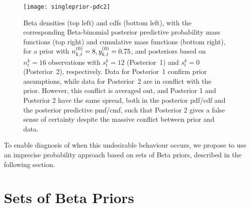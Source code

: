 \documentclass[12pt, a4paper]{elsarticle}
\begin{document}
\begin{figure}
\texttt{[image: singleprior-pdc2]}
\caption{Beta densities (top left) and cdfs (bottom left),
with the corresponding Beta-binomial posterior predictive probability mass functions (top right) and cumulative mass functions (bottom right),
for a prior with $n^{(0)}_{k,t} = 8, y^{(0)}_{k,t} = 0.75$,
and posteriors based on $n^k_t=16$ observations with $s^k_t=12$ (Posterior~1) and $s^k_t=0$ (Posterior~2), respectively.
Data for Posterior~1 confirm prior assumptions,
while data for Posterior~2 are in conflict with the prior.
However, this conflict is averaged out,
and Posterior 1 and Posterior 2 have the same spread, both in the posterior pdf/cdf and the posterior predictive pmf/cmf,
such that Posterior 2 gives a false sense of certainty despite the massive conflict between prior and data.}
\label{fig:singleprior-pdc}
\end{figure}

To enable diagnosis of when this undesirable behaviour occurs,
we propose to use an imprecise probability approach
based on sets of Beta priors, described in the following section.


\section{Sets of Beta Priors}
\label{sec:setsofbetapriors}
\end{document}
